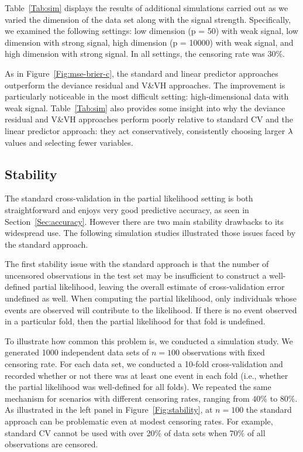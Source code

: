 Table~\ref{Tab:sim} displays the results of additional simulations carried out as we varied the dimension of the data set along with the signal strength.  Specifically, we examined the following settings: low dimension (p = 50) with weak signal, low dimension with strong signal, high dimension (p = 10000) with weak signal, and high dimension with strong signal. In all settings, the censoring rate was 30\%.

As in Figure~\ref{Fig:mse-brier-c}, the standard and linear predictor approaches outperform the deviance residual and V\&VH approaches.  The improvement is particularly noticeable in the most difficult setting: high-dimensional data with weak signal.  Table~\ref{Tab:sim} also provides some insight into why the deviance residual and V\&VH approaches perform poorly relative to standard CV and the linear predictor approach: they act conservatively, consistently choosing larger $\lambda$ values and selecting fewer variables. %

\subsection {Stability}
\label{Sec:stability}

The standard cross-validation in the partial likelihood setting is both straightforward and enjoys very good predictive accuracy, as seen in Section~\ref{Sec:accuracy}. However there are two main stability drawbacks to its widespread use. The following simulation studies illustrated those issues faced by the standard approach. 

The first stability issue with the standard approach is that the number of uncensored observations in the test set may be insufficient to construct a well-defined partial likelihood, leaving the overall estimate of cross-validation error undefined as well. When computing the partial likelihood, only individuals whose events are observed will contribute to the likelihood. If there is no event observed in a particular fold, then the partial likelihood for that fold is undefined. 

To illustrate how common this problem is, we conducted a simulation study. We generated 1000 independent data sets of $n = 100$ observations with fixed censoring rate. For each data set, we conducted a 10-fold cross-validation and recorded whether or not there was at least one event in each fold (i.e., whether the partial likelihood was well-defined for all folds). We repeated the same mechanism for scenarios with different censoring rates, ranging from $40\%$ to $80\%$. As illustrated in the left panel in Figure~\ref{Fig:stability}, at $n=100$ the standard approach can be problematic even at modest censoring rates. For example, standard CV cannot be used with over 20\% of data sets when $70\%$ of all observations are censored.


